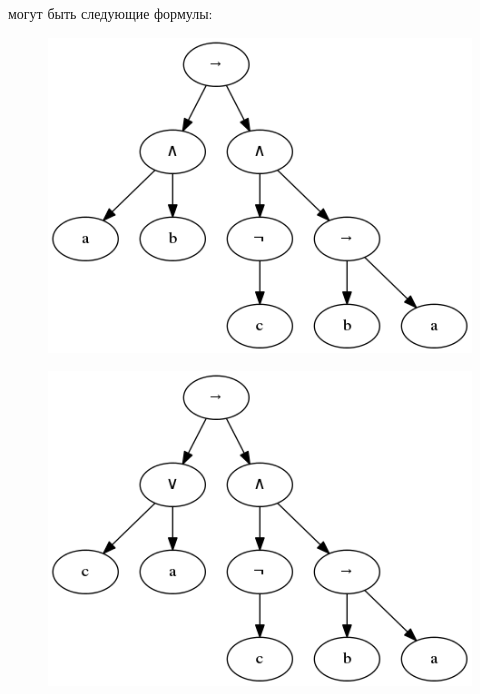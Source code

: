 \documentclass[12pt,fleqn]{article}
\begin{document}
могут быть следующие формулы:

\FloatBarrier

\begin{figure}[!h]
  \centering
    \includegraphics[scale=0.45]{t7.png}
\end{figure}

\begin{figure}[!h]
  \centering
    \includegraphics[scale=0.45]{t8.png}
\end{figure}
\end{document}
